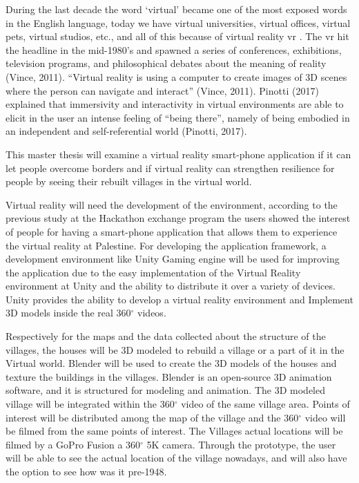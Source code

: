 During the last decade the word ‘virtual’ became one of the most exposed words in the
English language, today we have virtual universities, virtual offices, virtual pets, virtual
studios, etc., and all of this because of virtual reality \acrshort{vr} \citep{Vince2011}. The \acrshort{vr} hit the
headline in the mid-1980’s and spawned a series of conferences, exhibitions, television
programs, and philosophical debates about the meaning of reality (Vince, 2011). “Virtual
reality is using a computer to create images of 3D scenes where the person can navigate and
interact” (Vince, 2011). Pinotti (2017) explained that immersivity and interactivity in virtual
environments are able to elicit in the user an intense feeling of “being there”, namely of being
embodied in an independent and self-referential world (Pinotti, 2017).

This master thesis will examine a virtual reality smart-phone application if it can let people overcome borders and if virtual reality can strengthen resilience for people by seeing their rebuilt villages in the virtual world. 


Virtual reality will need the development of the environment, according to the previous study at the Hackathon exchange program the users showed the interest of people for having a smart-phone application that allows them to experience the virtual reality at Palestine. For developing the application framework, a development environment like Unity Gaming engine will be used for improving the application due to the easy implementation of the Virtual Reality environment at Unity and the ability to distribute it over a variety of devices. Unity provides the ability to develop a virtual reality environment and Implement 3D models inside the real 360$^{\circ}$ videos.


Respectively for the maps and the data collected about the structure of the villages, the houses will be 3D modeled to rebuild a village or a part of it in the Virtual world. Blender will be used to create the 3D models of the houses and texture the buildings in the villages. Blender is an open-source 3D animation software, and it is structured for modeling and animation. The 3D modeled village will be integrated within the 360$^{\circ}$ video of the same village area. Points of interest will be distributed among the map of the village and the 360$^{\circ}$ video will be filmed from the same points of interest. The Villages actual locations will be filmed by a GoPro Fusion a 360$^{\circ}$ 5K camera. Through the prototype, the user will be able to see the actual location of the village nowadays, and will also have the option to see how was it pre-1948. 

